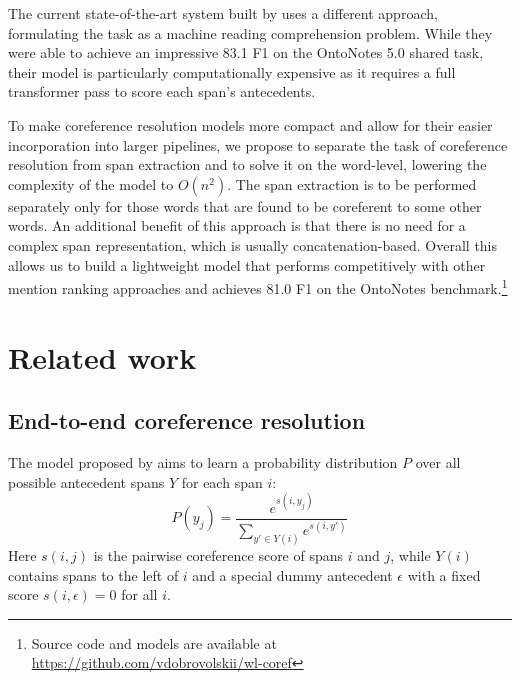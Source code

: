 \documentclass[11pt]{article}
\begin{document}
The current state-of-the-art system built by \citet{wu-etal-2020-corefqa} uses a different approach, formulating the task as a machine reading comprehension problem. While they were able to achieve an impressive 83.1 F1 on the OntoNotes 5.0 shared task, their model is particularly computationally expensive as it requires a full transformer pass to score each span's antecedents.

To make coreference resolution models more compact and allow for their easier incorporation into larger pipelines, we propose to separate the task of coreference resolution from span extraction and to solve it on the word-level, lowering the complexity of the model to $O(n^2)$. The span extraction is to be performed separately only for those words that are found to be coreferent to some other words. An additional benefit of this approach is that there is no need for a complex span representation, which is usually concatenation-based. Overall this allows us to build a lightweight model that performs competitively with other mention ranking approaches and achieves 81.0 F1 on the OntoNotes benchmark.\footnote{Source code and models are available at \url{https://github.com/vdobrovolskii/wl-coref}}

\section{Related work}
\subsection{End-to-end coreference resolution}
The model proposed by \citet{lee-etal-2018-higher} aims to learn a probability distribution $P$ over all possible antecedent spans $Y$ for each span $i$:
\begin{equation}
    P(y_j) = \frac{e^{s(i, y_j)}}{\sum_{y' \in Y(i)}e^{s(i, y')}}
\end{equation}
Here $s(i, j)$ is the pairwise coreference score of spans $i$ and $j$, while $Y(i)$ contains spans to the left of $i$ and a special dummy antecedent $\epsilon$ with a fixed score $s(i, \epsilon) = 0$ for all $i$.
\end{document}
